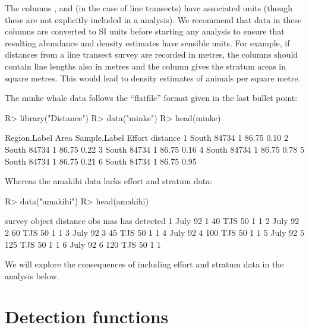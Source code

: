 \documentclass[article]{jss}
\begin{document}
The columns ,  and (in the case of line transects)  have associated units (though these are not explicitly included in a  analysis). We recommend that data in these columns are converted to SI units before starting any analysis to ensure that resulting abundance and density estimates have sensible units. For example, if distances from a line transect survey are recorded in metres, the  columns should contain line lengths also in metres and the  column gives the stratum areas in square metres. This would lead to density estimates of animals per square metre.

The minke whale data follows the ``flatfile'' format given in the last bullet point:
\begin{Schunk}
\begin{Sinput}
R> library("Distance")
R> data("minke")
R> head(minke)
\end{Sinput}
\begin{Soutput}
  Region.Label  Area Sample.Label Effort distance
1        South 84734            1  86.75     0.10
2        South 84734            1  86.75     0.22
3        South 84734            1  86.75     0.16
4        South 84734            1  86.75     0.78
5        South 84734            1  86.75     0.21
6        South 84734            1  86.75     0.95
\end{Soutput}
\end{Schunk}
Whereas the amakihi data lacks effort and stratum data:
\begin{Schunk}
\begin{Sinput}
R> data("amakihi")
R> head(amakihi)
\end{Sinput}
\begin{Soutput}
   survey object distance obs mas has detected
1 July 92      1       40 TJS  50   1        1
2 July 92      2       60 TJS  50   1        1
3 July 92      3       45 TJS  50   1        1
4 July 92      4      100 TJS  50   1        1
5 July 92      5      125 TJS  50   1        1
6 July 92      6      120 TJS  50   1        1
\end{Soutput}
\end{Schunk}

We will explore the consequences of including effort and stratum data in the analysis below.

\section{Detection functions}
\end{document}
